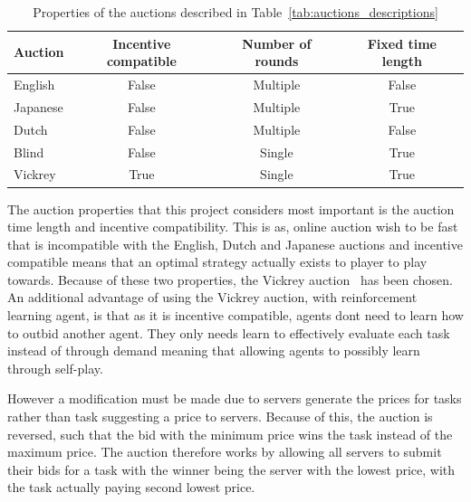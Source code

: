 \begin{table}[h]
    \centering
    \begin{tabular}{|l|c|c|c|} \hline
        \textbf{Auction}  & \textbf{Incentive compatible} & \textbf{Number of rounds} & \textbf{Fixed time length} \\ \hline
        English           & False                         & Multiple                  & False            \\ \hline
        Japanese          & False                         & Multiple                  & True             \\ \hline
        Dutch             & False                         & Multiple                  & False            \\ \hline
        Blind             & False                         & Single                    & True             \\ \hline
        Vickrey           & True                          & Single                    & True             \\ \hline
    \end{tabular}
    \caption{Properties of the auctions described in Table~\ref{tab:auctions_descriptions}}
    \label{tab:auction_properties}
\end{table}

The auction properties that this project considers most important is the auction time length and incentive compatibility.
This is as, online auction wish to be fast that is incompatible with the English, Dutch and Japanese auctions and
incentive compatible means that an optimal strategy actually exists to player to play towards. Because of these two
properties, the Vickrey auction~\citep{vickrey} has been chosen. An additional advantage of using the Vickrey auction,
with reinforcement learning agent, is that as it is incentive compatible, agents dont need to learn how to outbid
another agent. They only needs learn to effectively evaluate each task instead of through demand meaning that allowing
agents to possibly learn through self-play.

However a modification must be made due to servers generate the prices for tasks rather than task suggesting a price to servers.
Because of this, the auction is reversed, such that the bid with the minimum price wins the task instead of the maximum
price. The auction therefore works by allowing all servers to submit their bids for a task with the winner
being the server with the lowest price, with the task actually paying second lowest price.

